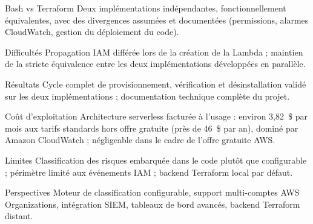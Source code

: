 \documentclass[11pt,a4paper]{report}
\begin{document}
\begin{keybox}{Bash vs Terraform}
Deux implémentations indépendantes, fonctionnellement équivalentes, avec des divergences assumées et documentées (permissions, alarmes CloudWatch, gestion du déploiement du code).
\end{keybox}

\begin{keybox}{Difficultés}
Propagation IAM différée lors de la création de la Lambda ; maintien de la stricte équivalence entre les deux implémentations développées en parallèle.
\end{keybox}

\begin{keybox}{Résultats}
Cycle complet de provisionnement, vérification et désinstallation validé sur les deux implémentations ; documentation technique complète du projet.
\end{keybox}

\begin{keybox}{Coût d'exploitation}
Architecture serverless facturée à l'usage : environ 3,82~\$ par mois aux tarifs standards hors offre gratuite (près de 46~\$ par an), dominé par Amazon CloudWatch ; négligeable dans le cadre de l'offre gratuite AWS.
\end{keybox}

\begin{keybox}{Limites}
Classification des risques embarquée dans le code plutôt que configurable ; périmètre limité aux événements IAM ; backend Terraform local par défaut.
\end{keybox}

\begin{keybox}{Perspectives}
Moteur de classification configurable, support multi-comptes AWS Organizations, intégration SIEM, tableaux de bord avancés, backend Terraform distant.
\end{keybox}
\end{document}
